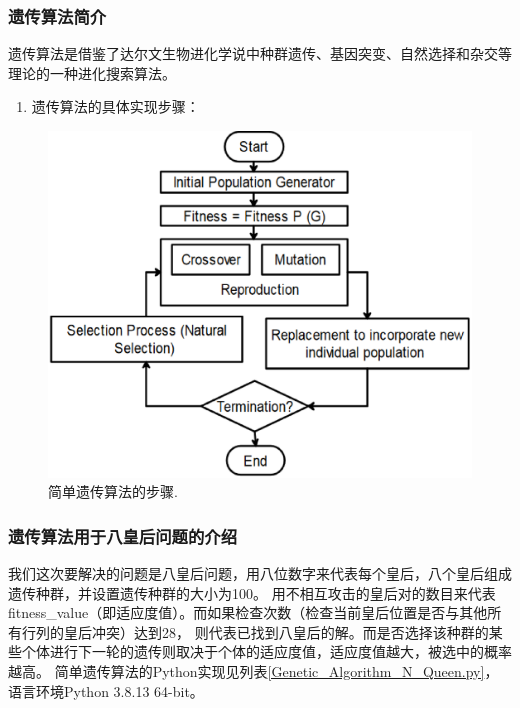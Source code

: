 \documentclass[12pt,a4paper,UTF8]{ctexart}
\begin{document}
\subsubsection{遗传算法简介}
遗传算法是借鉴了达尔文生物进化学说中种群遗传、基因突变、自然选择和杂交等理论的一种进化搜索算法。
\begin{enumerate}
    \item 遗传算法的具体实现步骤：
\end{enumerate}
\begin{figure}[htbp]
    \centering
    \includegraphics[width=12cm]{allpicture/alsxf-vpg1i.eps}
    \caption{简单遗传算法的步骤\cite{pandeyGeneticAlgorithmsConcepts2012}.}
    \label{fig:遗传算法的步骤}
\end{figure}
\subsubsection{遗传算法用于八皇后问题的介绍}
我们这次要解决的问题是八皇后问题，用八位数字来代表每个皇后，八个皇后组成遗传种群，并设置遗传种群的大小为100。
用不相互攻击的皇后对的数目来代表fitness\_value（即适应度值）。而如果检查次数（检查当前皇后位置是否与其他所有行列的皇后冲突）达到28，
则代表已找到八皇后的解。而是否选择该种群的某些个体进行下一轮的遗传则取决于个体的适应度值，适应度值越大，被选中的概率越高。
简单遗传算法的Python实现见列表\ref{Genetic_Algorithm_N_Queen.py}，语言环境Python 3.8.13 64-bit。

\end{document}
